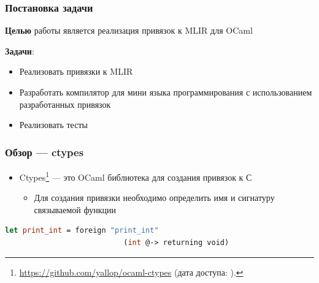 \documentclass{beamer}
\begin{document}




\begin{frame}
	\frametitle{Постановка задачи}
	\textbf{Целью} работы является реализация привязок к MLIR для OCaml %

	\textbf{Задачи}:
	\begin{itemize}
		\item Реализовать привязки к MLIR
		\item Разработать компилятор для мини языка программирования с использованием разработанных привязок
		\item Реализовать тесты
	\end{itemize}
\end{frame}

\begin{frame}[fragile]
	\frametitle{Обзор --- ctypes}

	\begin{itemize}
		\item Ctypes\footnote{\url{https://github.com/yallop/ocaml-ctypes} (дата доступа:   ).} --- это OCaml библиотека для создания привязок к \textsc{С}
		      \begin{itemize}
			      \item Для создания привязки необходимо определить имя и сигнатуру связываемой функции
		      \end{itemize}
	\end{itemize}

	\begin{lstlisting}[caption={Пример привязки <<print\_int>> для функции С, которая принимает \texttt{int} и возвращает \texttt{void}},language=Caml, frame=single]
let print_int = foreign "print_int"
                           (int @-> returning void)
\end{lstlisting}

\end{frame}
\end{document}
